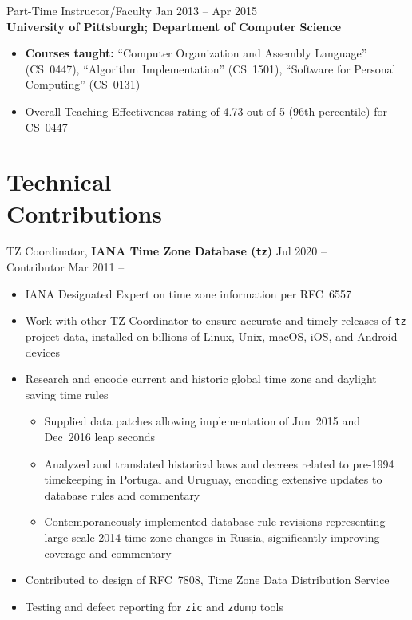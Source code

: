 \documentclass[11pt]{article}
\newcommand{\textdb}[1]{\fontseries{db}\selectfont#1\normalfont}
\newcommand{\present}{\phantom{Xxx 20XX}}
\begin{document}
\textdb{
Part-Time Instructor/Faculty
	\hfill Jan 2013 -- Apr 2015 \\
}
\textbf{University of Pittsburgh; Department of Computer Science}
\begin{itemize}
	\item \textbf{Courses taught:}
		``Computer Organization and Assembly Language'' (CS~0447),
		``Algorithm Implementation'' (CS~1501),
		``Software for Personal Computing'' (CS~0131)
	\item Overall Teaching Effectiveness rating of 4.73 out of 5
		(96th percentile) for CS~0447
\end{itemize}



\section{Technical\\ Contributions}

\textdb{
TZ Coordinator,
\textbf{IANA Time Zone Database (\texttt{tz})}
	\hfill Jul 2020 -- \present \\
}
\textdb{
Contributor
	\hfill Mar 2011 -- \present
}
\begin{itemize}
	\item IANA Designated Expert on time zone information per RFC~6557
	\item Work with other TZ Coordinator to ensure accurate and timely releases
		of \texttt{tz} project data,
		installed on billions of Linux, Unix, macOS, iOS, and Android devices
	\item Research and encode current and historic global time zone and daylight saving time rules
		\begin{itemize}
			\item Supplied data patches allowing implementation of
				Jun~2015 and Dec~2016 leap seconds
			\item Analyzed and translated historical laws and decrees
				related to pre-1994 timekeeping in Portugal and Uruguay,
				encoding extensive updates to database rules and commentary
			\item Contemporaneously implemented database rule revisions
				representing large-scale 2014 time zone changes in Russia,
				significantly improving coverage and commentary
		\end{itemize}
	\item Contributed to design of RFC~7808, Time Zone Data Distribution Service
	\item Testing and defect reporting for \texttt{zic} and \texttt{zdump} tools
\end{itemize}
\end{document}
